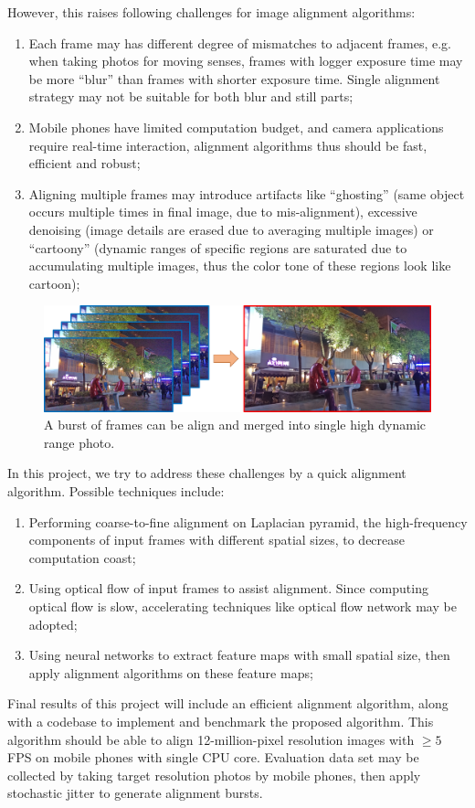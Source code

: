 \documentclass[conference, 10pt]{IEEEtran}
\makeatletter
\newcommand*{\eg}{e.g.\@\xspace}
\makeatother
\begin{document}
However, this raises following challenges for image alignment algorithms:
\begin{enumerate}
    \item Each frame may has different degree of mismatches to adjacent frames, \eg when taking photos for
    moving senses, frames with logger exposure time may be more ``blur'' than frames with shorter exposure time.
    Single alignment strategy may not be suitable for both blur and still parts;
    \item Mobile phones have limited computation budget, and camera applications require real-time interaction,
    alignment algorithms thus should be fast, efficient and robust;
    \item Aligning multiple frames may introduce artifacts like ``ghosting'' (same object occurs multiple times
    in final image, due to mis-alignment), excessive denoising (image details are erased due to averaging
    multiple images) or ``cartoony'' (dynamic ranges of specific regions are saturated due to accumulating
    multiple images, thus the color tone of these regions look like cartoon);
\end{enumerate}

\begin{figure}[t]
\centering
\includegraphics[width=\columnwidth]{img/intro_Liu_SIGGRAPH14.png}
\caption{A burst of frames can be align and merged into single high dynamic range photo.}
\label{img::intro}
\end{figure}

In this project, we try to address these challenges by a quick alignment algorithm. Possible techniques include:
\begin{enumerate}
    \item Performing coarse-to-fine alignment on Laplacian pyramid, the high-frequency components of input frames with different spatial sizes,
    to decrease computation coast;
    \item Using optical flow of input frames to assist alignment. Since computing optical flow is slow, accelerating
    techniques like optical flow network may be adopted;
    \item Using neural networks to extract feature maps with small spatial size, then apply alignment algorithms
    on these feature maps;
\end{enumerate}

Final results of this project will include an efficient alignment algorithm, along with a codebase to implement and benchmark
the proposed algorithm. This algorithm should be able to align 12-million-pixel resolution images with $\ge 5$ FPS on mobile phones with single CPU core.
Evaluation data set may be collected by taking target resolution photos by mobile phones, then apply stochastic jitter
to generate alignment bursts.
\end{document}

